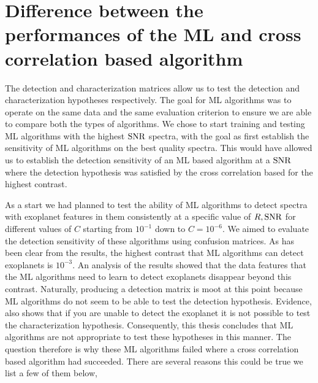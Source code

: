 \section{Difference between the performances of the ML and cross correlation based algorithm}
The detection and characterization matrices allow us to test the detection and characterization hypotheses respectively.
The goal for ML algorithms was to operate on the same data and the same evaluation criterion to ensure we are able to compare both the types of algorithms.
We chose to start training and testing ML algorithms with the highest $\rm{SNR}$ spectra, with the goal as first establish the sensitivity of ML algorithms on the best quality spectra.
This would have allowed us to establish the detection sensitivity of an ML based algorithm at a $\rm{SNR}$ where the detection hypothesis was satisfied by the cross correlation based for the highest contrast.

As a start we had planned to test the ability of ML algorithms to detect spectra with exoplanet features in them consistently at a specific value of $R,\rm{SNR}$ for different values of $C$ starting from $10^{-1}$ down to $C=10^{-6}$.
We aimed to evaluate the detection sensitivity of these algorithms using confusion matrices.
As has been clear from the results, the highest contrast that ML algorithms can detect exoplanets is $10^{-3}$.
An analysis of the results showed that the data features that the ML algorithms need to learn to detect exoplanets disappear beyond this contrast.
Naturally, producing a detection matrix is moot at this point because ML algorithms do not seem to be able to test the detection hypothesis. 
Evidence, also shows that if you are unable to detect the exoplanet it is not possible to test the characterization hypothesis.
Consequently, this thesis concludes that ML algorithms are not appropriate to test these hypotheses in this manner.
The question therefore is why these ML algorithms failed where a cross correlation based algorithm had succeeded.
There are several reasons this could be true we list a few of them below,
